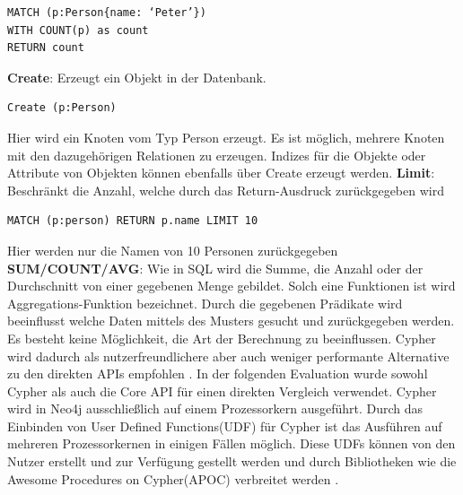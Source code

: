 \begin{Verbatim}[frame=single]
MATCH (p:Person{name: ‘Peter’})  
WITH COUNT(p) as count  
RETURN count
\end{Verbatim} 
\textbf{Create}: Erzeugt ein Objekt in der Datenbank. 
\begin{Verbatim}[frame=single]
Create (p:Person)
\end{Verbatim}
Hier wird ein Knoten vom Typ Person erzeugt. Es ist möglich, mehrere Knoten mit den dazugehörigen Relationen zu erzeugen. Indizes  für die Objekte oder Attribute von Objekten können ebenfalls über Create erzeugt werden.\newline
\textbf{Limit}: Beschränkt die Anzahl, welche durch das Return-Ausdruck zurückgegeben wird 
\begin{Verbatim}[frame=single]
MATCH (p:person) RETURN p.name LIMIT 10
\end{Verbatim} 
Hier werden nur die Namen  von 10 Personen zurückgegeben\newline
\textbf{SUM/COUNT/AVG}: Wie in SQL wird die Summe, die Anzahl oder der Durchschnitt von einer gegebenen Menge gebildet. Solch eine Funktionen ist wird Aggregations-Funktion bezeichnet. \newline \newline
Durch die gegebenen Prädikate wird beeinflusst welche Daten mittels des Musters gesucht und zurückgegeben werden. Es besteht keine Möglichkeit, die Art der Berechnung zu beeinflussen. Cypher wird dadurch als nutzerfreundlichere aber auch weniger performante Alternative zu den direkten APIs empfohlen \parencite{vukotic2015neo4j}. In der folgenden Evaluation wurde sowohl Cypher als auch die Core API für einen direkten Vergleich verwendet. Cypher wird in Neo4j ausschließlich auf einem Prozessorkern ausgeführt. Durch das Einbinden von User Defined Functions(UDF) für Cypher ist das Ausführen auf mehreren Prozessorkernen in einigen Fällen möglich. Diese UDFs können von den Nutzer erstellt und zur Verfügung gestellt werden und  durch Bibliotheken wie die Awesome Procedures on Cypher(APOC) verbreitet werden \parencite{APOC}.

